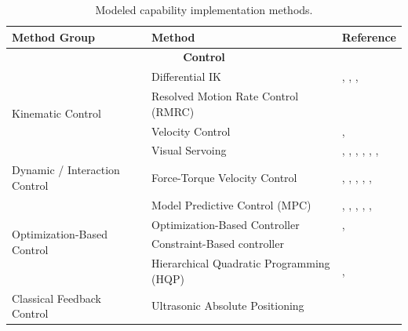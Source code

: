 \begin{table}[!h]
\thispagestyle{empty}
\caption{Modeled capability implementation methods.}
\label{tab_method_modeled}
\centering
\begin{tabular}{|p{4cm}|p{5cm}|p{15cm}|}
\hline
\textbf{Method Group} & \textbf{Method} & \textbf{Reference} \\
\hline
\multicolumn{3}{|c|}{\textbf{Control}} \\
\hline
\multirow{4}{*}{\parbox{3cm}{Kinematic Control}}
    & Differential IK                                      & \cite{Stckler2014AdaptiveTS}, \cite{Knobbe2022CorePI}, \cite{Shi2021MaximizingTU}, \cite{Watanabe2025IntegratingBP} \\
\cline{2-3}
    & Resolved Motion Rate Control (RMRC)                  & \cite{Shi2012MobileRA} \\
\cline{2-3}
    & Velocity Control                                     & \cite{Laaksonen2010EmbodimentIM}, \cite{Sequeira2000BehaviourbasedCB} \\
\cline{2-3}
    & Visual Servoing                                      & \cite{Tsay2010MaterialHO}, \cite{Shi2012MobileRA}, \cite{Wasik2002AFB}, \cite{Andrian2005EmbeddedCI}, \cite{Lee2023DevelopmentAV}, \cite{Gupta2025PreciseMM}, \cite{Fu2024MobileAL} \\
\hline
\multirow{1}{*}{\parbox{4cm}{Dynamic / Interaction Control}}
    & Force-Torque Velocity Control                        & \cite{Stroupe2005BehaviorbasedMC}, \cite{Aarno2008MotionIR}, \cite{Gller2024APB}, \cite{Lee2023DevelopmentAV}, \cite{Shi2021MaximizingTU}, \cite{Meng2023AerialMS} \\
\hline
\multirow{4}{*}{\parbox{4cm}{Optimization-Based Control}}
    & Model Predictive Control (MPC)                       & \cite{Arrais2019ApplicationOT}, \cite{Rigo2022ContactOF}, \cite{Gller2024APB}, \cite{Qin2022LearningFH}, \cite{Bertoncelli2020LinearTM}, \cite{Kumbhar2025MPCQPBasedCF} \\
\cline{2-3}
    & Optimization-Based Controller                        & \cite{Singh2013CoordinatingMM}, \cite{Beetz2016OpenRR} \\
\cline{2-3}
    & Constraint-Based controller                          & \cite{Beetz2016OpenRR} \\
\cline{2-3}
    & Hierarchical Quadratic Programming (HQP) & \cite{Zhao2025ACL}, \cite{Zhao2025ReactiveWL} \\
\hline
\multirow{3}{*}{\parbox{4cm}{Classical Feedback Control}}
    & Ultrasonic Absolute Positioning                      & \cite{Lin2010ResearchOO} \\

\end{tabular}
\end{table}

